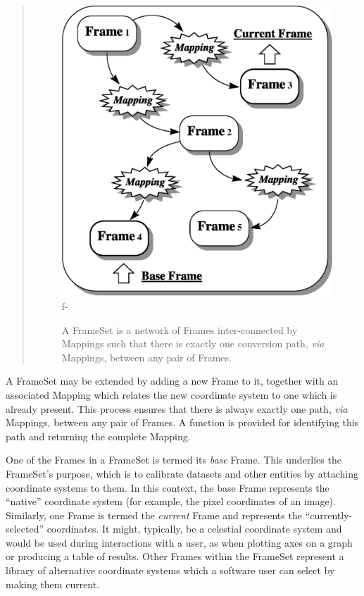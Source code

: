 \documentclass[twoside,11pt]{article}
\begin{document}
\begin{htmlonly}
\begin{quote}
\begin{figure}
   \includegraphics[scale=1.0]{sun210_figures/frameset.eps}
f-
   \caption{A FrameSet is a network of Frames inter-connected by Mappings
   such that there is exactly one conversion path, {\em{via}} Mappings,
   between any pair of Frames.}
   \end{figure}
   \end{quote}
\end{htmlonly}
A FrameSet may be extended by adding a new Frame to it, together with
an associated Mapping which relates the new coordinate system to one
which is already present.  This process ensures that there is always
exactly one path, {\em{via}} Mappings, between any pair of Frames.  A
function is provided for identifying this path and returning the
complete Mapping.

One of the Frames in a FrameSet is termed its {\em{base}} Frame.  This
underlies the FrameSet's purpose, which is to calibrate datasets and
other entities by attaching coordinate systems to them.  In this
context, the base Frame represents the ``native'' coordinate system
(for example, the pixel coordinates of an image).  Similarly, one
Frame is termed the {\em{current}} Frame and represents the
``currently-selected'' coordinates.  It might, typically, be a
celestial coordinate system and would be used during interactions with
a user, as when plotting axes on a graph or producing a table of
results.  Other Frames within the FrameSet represent a library of
alternative coordinate systems which a software user can select by
making them current.
\end{document}
